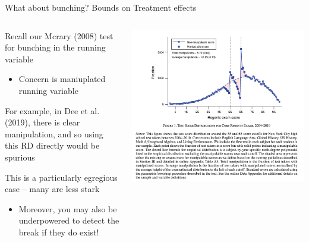 \documentclass[notes,11pt, aspectratio=169]{beamer}
\newenvironment{wideitemize}{\itemize\addtolength{\itemsep}{10pt}}{\enditemize}
\begin{document}
\begin{frame}{What about bunching? Bounds on Treatment effects}
    \begin{columns}[onlytextwidth, T] %
      \begin{column}{.6\textwidth}
        \begin{wideitemize}
        \item Recall our Mcrary (2008) test for bunching in the running variable
          \begin{itemize}
          \item Concern is  maniuplated running variable
          \end{itemize}
        \item For example, in Dee et al. (2019), there is clear
          manipulation, and so using this RD directly would be
          spurious
        \item This is a particularly egregious case -- many are less stark
          \begin{itemize}
          \item Moreover, you may also be underpowered to detect the
            break if they do exist!
          \end{itemize}
        \end{wideitemize}
      \end{column}%
      \hfill%
      \begin{column}{.4\textwidth}
        \includegraphics[width=\linewidth]{images/dee_dobbie.png}
      \end{column}%
    \end{columns}  
  \end{frame}
\end{document}
